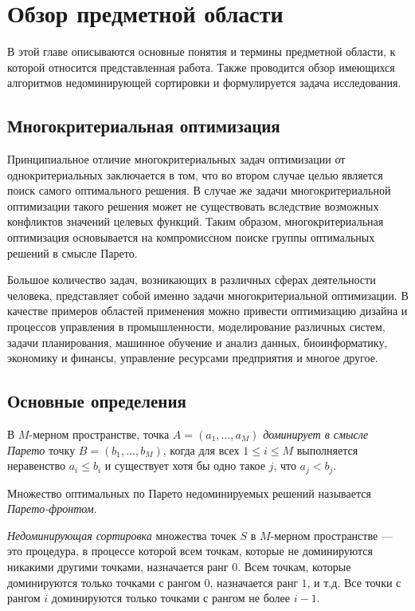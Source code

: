 \chapter{Обзор предметной области}
В этой главе описываются основные понятия и термины предметной области, к которой относится представленная работа. Также проводится обзор имеющихся алгоритмов недоминирующей сортировки и формулируется задача исследования.

\section{Многокритериальная оптимизация}
Принципиальное отличие многокритериальных задач оптимизации от однокритериальных заключается в том, что во втором случае целью является поиск самого оптимального решения.
В случае же задачи многокритериальной оптимизации такого решения может не существовать вследствие возможных конфликтов значений целевых функций.
Таким образом, многокритериальная оптимизация основывается на компромиссном поиске группы оптимальных решений в смысле Парето.

Большое количество задач, возникающих в различных сферах деятельности человека, представляет собой именно задачи многокритериальной оптимизации.
В качестве примеров областей применения можно привести оптимизацию дизайна и процессов управления в промышленности, моделирование различных систем, задачи планирования, машинное обучение и анализ данных, биоинформатику, экономику и финансы, управление ресурсами предприятия и многое другое.

\section{Основные определения}
\begin{definition}
    В $M$-мерном пространстве, точка $A = (a_1, \ldots, a_M)$ \textit{доминирует в смысле Парето} точку $B = (b_1, \ldots, b_M)$, когда для всех $1 \leq i \leq M$ выполняется неравенство $a_i \leq b_i$ и существует хотя бы одно такое $j$, что $a_j < b_j$.
\end{definition}
\begin{definition}
    Множество оптимальных по Парето недоминируемых решений называется \textit{Парето-фронтом}.
\end{definition}
\begin{definition}
\textit{Недоминирующая сортировка} множества точек $S$ в $M$-мерном пространстве --- это процедура, в процессе которой всем точкам, которые не доминируются никакими другими точками, назначается ранг $0$.
Всем точкам, которые доминируются только точками с рангом $0$, назначается ранг $1$, и т.д.
Все точки с рангом $i$ доминируются только точками с рангом не более $i - 1$.
\end{definition}

